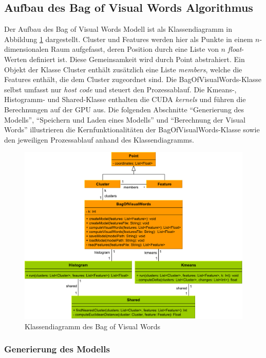 \subsection{Aufbau des Bag of Visual Words Algorithmus}

Der Aufbau des Bag of Visual Words Modell ist als Klassendiagramm in Abbildung \ref{img:bovw_class} dargestellt. Cluster und Features werden hier als Punkte in einem $n$-dimensionalen Raum aufgefasst, deren Position durch eine Liste von $n$ \textit{float}-Werten definiert ist. Diese Gemeinsamkeit wird durch Point abstrahiert. Ein Objekt der Klasse Cluster enthält zusätzlich eine Liste \textit{members}, welche die Features enthält, die dem Cluster zugeordnet sind.
Die BagOfVisualWords-Klasse selbst umfasst nur \textit{host code} und steuert den Prozessablauf. Die Kmeans-, Histogramm- und Shared-Klasse enthalten die CUDA \textit{kernels} und führen die Berechnungen auf der GPU aus.\newline
Die folgenden Abschnitte \enquote{Generierung des Modells}, \enquote{Speichern und Laden eines Modells} und \enquote{Berechnung der Visual Words} illustrieren die Kernfunktionalitäten der BagOfVisualWords-Klasse sowie den jeweiligen Prozessablauf anhand des Klassendiagramms.

\begin{figure}
	\centering
	\includegraphics[scale=0.57]{images/bovw_class.pdf}
	\caption{Klassendiagramm des Bag of Visual Words}
	\label{img:bovw_class}
\end{figure}
 
\subsubsection{Generierung des Modells}

